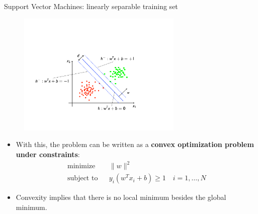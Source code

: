 \documentclass[xcolor=pdftex,dvipsnames,table]{beamer}
\begin{document}
\begin{frame}{Support Vector Machines: linearly separable training set}
	\begin{figure}[htb]
		\includegraphics[width=0.7\textwidth]{../graphics/SVM2.pdf}
	\end{figure}
	\begin{itemize}
		\item With this, the problem can be written as a \textbf{convex optimization problem under constraints}:
		\begin{eqnarray*}
			\mbox{minimize} & & \|w\|^2 \\
			\mbox{subject to} & & y_i(w^Tx_i + b) \geq 1 \quad i = 1, \ldots, N
		\end{eqnarray*}
		\item Convexity implies that there is no local minimum besides the global minimum.
	\end{itemize}
\end{frame}
\end{document}
